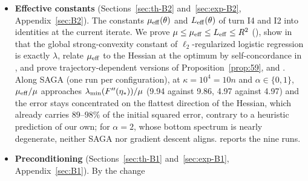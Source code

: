 \begin{itemize}[leftmargin=1.4em,itemsep=1pt,topsep=2pt]
and I4 (strong convexity, 0.25--0.36) carry 0.77--0.96 of it; the largest shares of I3 and I5 are 0.54\% and
22\%. At $\kappa=10^3$, the textbook constants are within 17\% of the best ones of the proof, those of
, while SAGA ($\alpha=1$, 3 seeds) still converges at $\gamma R^2=4$, eight times the
supremum $\frac12$ of the steps $\gamma R^2$ admitted by .
\item \textbf{Effective constants} (Sections~\ref{sec:th-B2} and~\ref{sec:exp-B2}, Appendix~\ref{sec:B2}). The
constants $\mu_{\mathrm{eff}}(\theta)$ and $L_{\mathrm{eff}}(\theta)$ of  turn I4 and I2 into identities at the current
iterate. We prove $\mu\le\mu_{\mathrm{eff}}\le L_{\mathrm{eff}}\le R^2$ (), show in  that the
global strong-convexity constant of $\ell_2$-regularized logistic regression is exactly $\lambda$, relate $\mu_{\mathrm{eff}}$ to
the Hessian at the optimum by self-concordance in , and prove trajectory-dependent versions of
Proposition~\ref{prop:59},  and . Along SAGA (one run per
configuration), at $\kappa=10^4=10n$ and $\alpha\in\{0,1\}$, $\mu_{\mathrm{eff}}/\mu$ approaches $\lambda_{\min}(F''(\eta_\ast))/\mu$ (9.94
against 9.86, 4.97 against 4.97) and the error stays concentrated on the flattest direction of the Hessian, which already
carries $89$--$98\%$ of the initial squared error, contrary to a heuristic prediction of our own; for $\alpha=2$, whose bottom spectrum is nearly degenerate, neither SAGA nor
gradient descent aligns.  reports the nine runs.
\item \textbf{Preconditioning} (Sections~\ref{sec:th-B1} and~\ref{sec:exp-B1}, Appendix~\ref{sec:B1}). By the change

\end{itemize}
